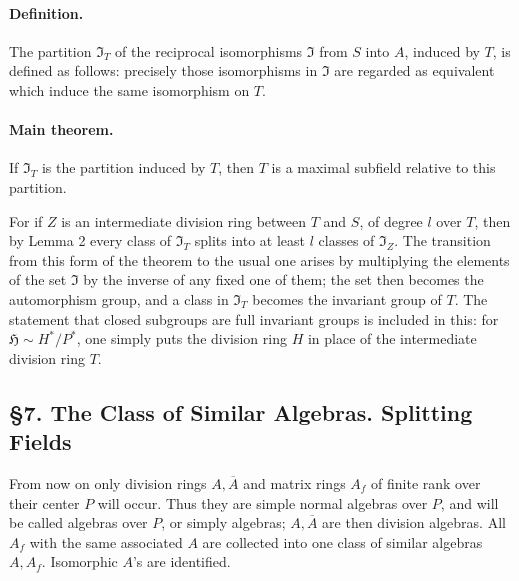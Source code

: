 \documentclass[11pt]{article}
\begin{document}
\paragraph{Definition.}
The partition \(\mathfrak I_T\) of the reciprocal isomorphisms \(\mathfrak I\) from \(S\) into \(A\), induced by \(T\), is defined as follows: precisely those isomorphisms in \(\mathfrak I\) are regarded as equivalent which induce the same isomorphism on \(T\).

\paragraph{Main theorem.}
If \(\mathfrak I_T\) is the partition induced by \(T\), then \(T\) is a maximal subfield relative to this partition.

For if \(Z\) is an intermediate division ring between \(T\) and \(S\), of degree \(l\) over \(T\), then by Lemma 2 every class of \(\mathfrak I_T\) splits into at least \(l\) classes of \(\mathfrak I_Z\). The transition from this form of the theorem to the usual one arises by multiplying the elements of the set \(\mathfrak I\) by the inverse of any fixed one of them; the set then becomes the automorphism group, and a class in \(\mathfrak I_T\) becomes the invariant group of \(T\). The statement that closed subgroups are full invariant groups is included in this: for \(\mathfrak H\sim H^*/P^*\), one simply puts the division ring \(H\) in place of the intermediate division ring \(T\).

\subsection*{§7. The Class of Similar Algebras. Splitting Fields}

From now on only division rings \(A,\overline A\) and matrix rings \(A_f\) of finite rank over their center \(P\) will occur. Thus they are simple normal algebras over \(P\), and will be called algebras over \(P\), or simply algebras; \(A,\overline A\) are then division algebras. All \(A_f\) with the same associated \(A\) are collected into one class of similar algebras \(A,A_f\). Isomorphic \(A\)'s are identified.
\end{document}
